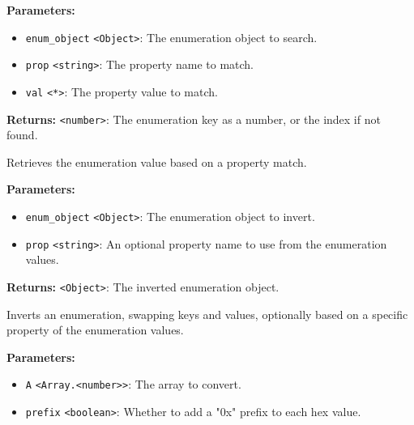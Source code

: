 \documentclass[12pt,a4paper]{article}
\begin{document}
\vspace{5mm}
\noindent {}


\noindent \textbf{Parameters:}
\begin{itemize}
  \item \texttt{enum\_object} \texttt{<Object>}: The enumeration object to search.
  \item \texttt{prop} \texttt{<string>}: The property name to match.
  \item \texttt{val} \texttt{<*>}: The property value to match.
\end{itemize}

\noindent \textbf{Returns:} \texttt{<number>}: The enumeration key as a number, or the index if not found.

\noindent Retrieves the enumeration value based on a property match.

\vspace{5mm}
\noindent {}


\noindent \textbf{Parameters:}
\begin{itemize}
  \item \texttt{enum\_object} \texttt{<Object>}: The enumeration object to invert.
  \item \texttt{prop} \texttt{<string>}: An optional property name to use from the enumeration values.
\end{itemize}

\noindent \textbf{Returns:} \texttt{<Object>}: The inverted enumeration object.

\noindent Inverts an enumeration, swapping keys and values, optionally based on a specific property of the enumeration values.

\vspace{5mm}
\noindent {}


\noindent \textbf{Parameters:}
\begin{itemize}
  \item \texttt{A} \texttt{<Array.<number>>}: The array to convert.
  \item \texttt{prefix} \texttt{<boolean>}: Whether to add a "0x" prefix to each hex value.
\end{itemize}
\end{document}
